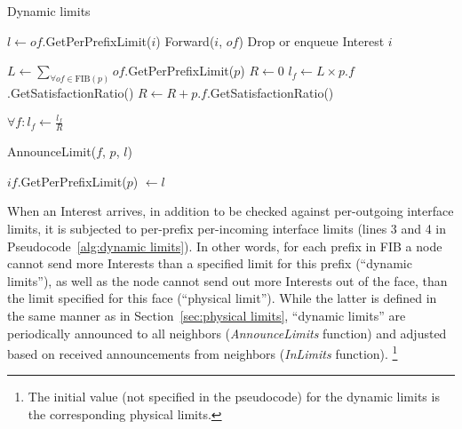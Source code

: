 \begin{algorithm}[h]
\caption{Dynamic limits}
\label{alg:dynamic limits}
\begin{algorithmic}[1]
    \State $l \leftarrow of$.GetPerPrefixLimit($i$)
        \State Forward($i$, $of$)
    \Else
        \State Drop or enqueue Interest $i$
    \EndIf
\EndFor
\EndFunction

\vspace{0.2cm}

 
    \State $L \leftarrow \displaystyle\sum\limits_{\mathrm{\forall \mathit{of} \in FIB(\mathit{p})}}{}{}of$.GetPerPrefixLimit($p$)
    \State $R \leftarrow 0$
        \State $l_f \leftarrow L \times p$.$f$.GetSatisfactionRatio()
        \State $R \leftarrow R + p$.$f$.GetSatisfactionRatio()
    \EndFor

     
        \State $\forall f : l_f \leftarrow \displaystyle\frac{l_f}{R}$ 
    \EndIf

        \State AnnounceLimit($f$, $p$, $l$)
\EndFor
\EndFunction

\vspace{0.2cm}

\State{} 
    \State $if$.GetPerPrefixLimit($p$) $\leftarrow l$ 
\EndFunction

\end{algorithmic}
\end{algorithm}

When an Interest arrives, in addition to be checked against per-outgoing interface limits, it is subjected to per-prefix per-incoming interface limits (lines 3 and 4 in Pseudocode~\ref{alg:dynamic limits}).
In other words, for each prefix in FIB a node cannot send more Interests than a specified limit for this prefix (``dynamic limits''), as well as the node cannot send out more Interests out of the face, than the limit specified for this face (``physical limit'').
While the latter is defined in the same manner as in Section~\ref{sec:physical limits}, ``dynamic limits'' are periodically announced to all neighbors (\textit{AnnounceLimits} function) and adjusted based on received announcements from neighbors (\textit{InLimits} function).%
\footnote{The initial value (not specified in the pseudocode) for the dynamic limits is the corresponding physical limits.}

